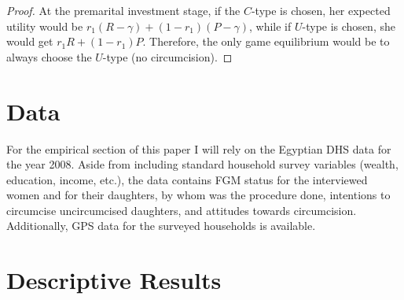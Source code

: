 \documentclass[12pt]{article}
\begin{document}
\begin{proof}
  At the premarital investment stage, if the $C$-type is chosen, her expected utility would be $r_1(R-\gamma) + (1-r_1)(P-\gamma)$, while if $U$-type is chosen, she would get $r_1R + (1-r_1)P$. Therefore, the only game equilibrium would be to always choose the $U$-type (no circumcision).

\end{proof}

\section{Data}\label{sec:data}

For the empirical section of this paper I will rely on the Egyptian DHS data for the year 2008.  Aside from including standard household survey variables (wealth, education, income, etc.), the data contains FGM status for the interviewed women and for their daughters, by whom was the procedure done, intentions to circumcise uncircumcised daughters, and attitudes towards circumcision. Additionally, GPS data for the surveyed households is available.

\section{Descriptive Results}



\nocite{Refaat}
\nocite{Yount}
\nocite{Hoodfar1997}
\nocite{El-Gibaly2002}



\end{document}
